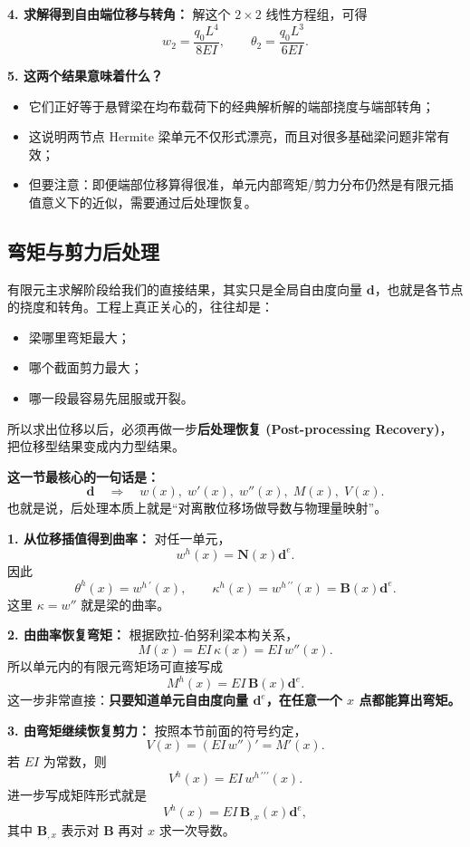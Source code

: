 \documentclass[11pt, a4paper, UTF8]{ctexart}
\begin{document}
\textbf{4. 求解得到自由端位移与转角：}
解这个 $2\times2$ 线性方程组，可得
\[
w_2 = \frac{q_0 L^4}{8EI},
\qquad
\theta_2 = \frac{q_0 L^3}{6EI}.
\]

\textbf{5. 这两个结果意味着什么？}
\begin{itemize}
    \item 它们正好等于悬臂梁在均布载荷下的经典解析解的端部挠度与端部转角；
    \item 这说明两节点 Hermite 梁单元不仅形式漂亮，而且对很多基础梁问题非常有效；
    \item 但要注意：即便端部位移算得很准，单元内部弯矩/剪力分布仍然是有限元插值意义下的近似，需要通过后处理恢复。
\end{itemize}

\subsection{弯矩与剪力后处理}
有限元主求解阶段给我们的直接结果，其实只是全局自由度向量 $\bm{d}$，也就是各节点的挠度和转角。工程上真正关心的，往往却是：
\begin{itemize}
    \item 梁哪里弯矩最大；
    \item 哪个截面剪力最大；
    \item 哪一段最容易先屈服或开裂。
\end{itemize}
所以求出位移以后，必须再做一步\textbf{后处理恢复 (Post-processing Recovery)}，把位移型结果变成内力型结果。

\textbf{这一节最核心的一句话是：}
\[
\bm{d} \quad \Longrightarrow \quad w(x),\; w'(x),\; w''(x),\; M(x),\; V(x).
\]
也就是说，后处理本质上就是“对离散位移场做导数与物理量映射”。

\textbf{1. 从位移插值得到曲率：}
对任一单元，
\[
w^h(x) = \bm{N}(x)\bm{d}^e.
\]
因此
\[
\theta^h(x)=w^{h\,\prime}(x),
\qquad
\kappa^h(x)=w^{h\,\prime\prime}(x)=\bm{B}(x)\bm{d}^e.
\]
这里 $\kappa=w''$ 就是梁的曲率。

\textbf{2. 由曲率恢复弯矩：}
根据欧拉-伯努利梁本构关系，
\[
M(x)=EI\,\kappa(x)=EI\,w''(x).
\]
所以单元内的有限元弯矩场可直接写成
\[
M^h(x)=EI\,\bm{B}(x)\bm{d}^e.
\]
这一步非常直接：\textbf{只要知道单元自由度向量 $\bm{d}^e$，在任意一个 $x$ 点都能算出弯矩。}

\textbf{3. 由弯矩继续恢复剪力：}
按照本节前面的符号约定，
\[
V(x) = (EI\, w'')' = M'(x).
\]
若 $EI$ 为常数，则
\[
V^h(x)=EI\,w^{h\,\prime\prime\prime}(x).
\]
进一步写成矩阵形式就是
\[
V^h(x)=EI\,\bm{B}_{,x}(x)\bm{d}^e,
\]
其中 $\bm{B}_{,x}$ 表示对 $\bm{B}$ 再对 $x$ 求一次导数。
\end{document}

